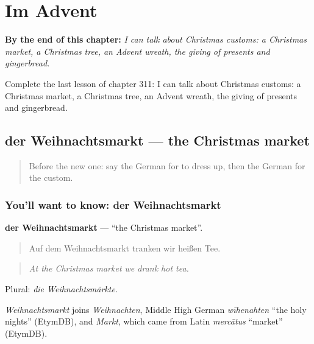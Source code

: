 
\chapter{Im Advent}
\label{ch:ge-im-advent}

\begin{chapteropening}
\textbf{By the end of this chapter:} \emph{I can talk about Christmas customs: a Christmas market, a Christmas tree, an Advent wreath, the giving of presents and gingerbread.}

Complete the last lesson of chapter 311: I can talk about Christmas customs: a Christmas market, a Christmas tree, an Advent wreath, the giving of presents and gingerbread.
\end{chapteropening}

\section[der Weihnachtsmarkt]{der Weihnachtsmarkt — the Christmas market}

\label{lesson:GE-C311-weihnachtsmarkt}



\begin{quote}
Before the new one: say the German for to dress up, then the German for the custom.
\end{quote}

\subsection*{You'll want to know: der Weihnachtsmarkt}
\textbf{der Weihnachtsmarkt} — \textquotedblleft{}the Christmas market\textquotedblright{}.

\begin{quote}
Auf dem Weihnachtsmarkt tranken wir heißen Tee.
\end{quote}

\begin{quote}
\emph{At the Christmas market we drank hot tea.}
\end{quote}

Plural: \emph{die Weihnachtsmärkte}.

\begin{cousinweb}
\emph{Weihnachtsmarkt} joins \emph{Weihnachten}, Middle High German \emph{wīhenahten} \textquotedblleft{}the holy nights\textquotedblright{} (EtymDB), and \emph{Markt}, which came from Latin \emph{mercātus} \textquotedblleft{}market\textquotedblright{} (EtymDB).
\end{cousinweb}

